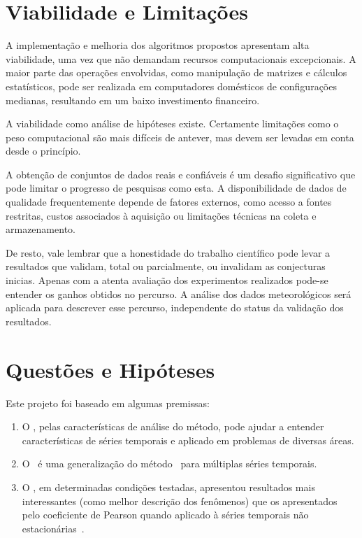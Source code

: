 \section{Viabilidade e Limitações}
\label{sec:limites}


A implementação e melhoria dos algoritmos propostos apresentam alta viabilidade, uma vez que não demandam recursos computacionais excepcionais. A maior parte das operações envolvidas, como manipulação de matrizes e cálculos estatísticos, pode ser realizada em computadores domésticos de configurações medianas, resultando em um baixo investimento financeiro.

A viabilidade como análise de hipóteses existe. Certamente limitações como o peso computacional são mais difíceis de antever, mas devem ser levadas em
conta desde o princípio.

A obtenção de conjuntos de dados reais e confiáveis é um desafio significativo que pode limitar o progresso de pesquisas como esta. A disponibilidade de dados de qualidade frequentemente depende de fatores externos, como acesso a fontes restritas, custos associados à aquisição ou limitações técnicas na coleta e armazenamento.

De resto, vale lembrar que a honestidade do trabalho científico pode levar a resultados que validam, total ou parcialmente, ou invalidam as conjecturas inicias. Apenas com a atenta avaliação dos experimentos realizados pode-se entender os ganhos obtidos no percurso. A análise dos dados meteorológicos será aplicada para descrever esse percurso, independente do status da validação dos resultados.


\section{Questões e Hipóteses}
\label{sec:questoes}

Este projeto foi baseado em algumas premissas:

\begin{enumerate}
    \label{enum:premissas}

    \item O \dmc, pelas características de análise do método, pode ajudar a entender características de séries temporais e aplicado em problemas de diversas áreas.
    \item O \dmc~é uma generalização do método \pdcca~para múltiplas séries temporais.
	\item O \pdcca, em determinadas condições testadas, apresentou resultados mais interessantes (como melhor descrição dos fenômenos) que os apresentados pelo coeficiente de Pearson quando aplicado à séries temporais não estacionárias~\cite{Wang2013}. 
\end{enumerate}

